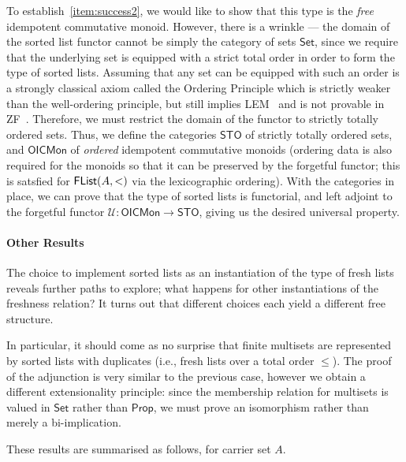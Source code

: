 \documentclass[a4paper]{easychair}
\newcommand{\AgdaFontStyle}[1]{\textsf{#1}}
\newcommand{\AgdaFormat}[2]{#2}
\newcommand{\AgdaNoSpaceMath}[1]
    {\begingroup\thickmuskip=0mu\medmuskip=0mu#1\endgroup}
\newcommand{\AgdaDatatype}[1]
    {\AgdaNoSpaceMath{\textcolor{AgdaDatatype}{\AgdaFontStyle{\AgdaFormat{#1}{{#1}}}}}}
\newcommand{\flistsymb}{\AgdaDatatype{FList}}
\newcommand{\flist}[2]{\ensuremath{\flistsymb(#1,#2)}}
\newcommand\setuniv{\mathsf{Set}} %
\newcommand\propuniv{\mathsf{Prop}} %
\newcommand\sto{\mathsf{STO}}
\newcommand\oicm{\mathsf{OICMon}}
\newcommand{\Forget}{\mathcal{U}}
\newcommand\forgetoicm{\Forget : \oicm{} \to{} \sto{}}
\begin{document}
To establish~\eqref{item:success2}, we would like to show that this type is the \emph{free} idempotent commutative monoid.
However, there is a wrinkle --- the domain of the sorted list functor cannot be simply the category of sets $\setuniv$, since we require that the underlying set is equipped with a strict total order in order to form the type of sorted lists.
Assuming that any set can be equipped with such an order is a strongly classical axiom called the Ordering Principle which is strictly weaker than the well-ordering principle, but still implies LEM~\cite{swanOPLEM} and is not provable in ZF~\cite{jech1973choice}.
Therefore, we must restrict the domain of the functor to strictly totally ordered sets.
%
Thus, we define the categories $\sto$ of strictly totally ordered sets, and
$\oicm$ of \emph{ordered} idempotent commutative monoids (ordering data is also required for the monoids so that it can be preserved by the forgetful functor; this is satsfied for \flist{A}{<} via the lexicographic ordering).
With the categories in place, we can prove that the type of sorted lists is functorial, and left adjoint to the forgetful functor $\forgetoicm$, giving us the desired universal property.

\paragraph{Other Results}

The choice to implement sorted lists as an instantiation of the type of fresh lists reveals further paths to explore;
what happens for other instantiations of the freshness relation?
It turns out that different choices each yield a different free structure.

In particular, it should come as no surprise that finite multisets are represented by sorted lists with duplicates (i.e., fresh lists over a total order $\leq$).
The proof of the adjunction is very similar to the previous case,
however we obtain a different extensionality principle:
since the membership relation for multisets is valued in $\setuniv$ rather than $\propuniv$, we must prove an isomorphism rather than merely a bi-implication.

These results are summarised as follows, for carrier set $A$.
\end{document}
